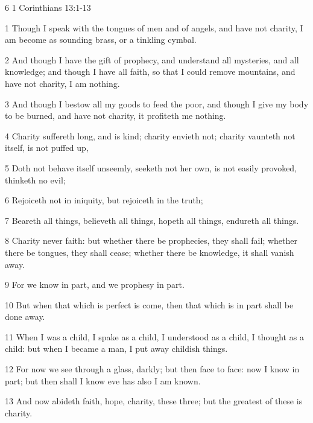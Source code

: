 
6 1 Corinthians 13:1-13

1 Though I speak with the tongues of men and of angels, and have not charity, I
am become as sounding brass, or a tinkling cymbal.

2 And though I have the gift of prophecy, and understand all mysteries, and all
knowledge; and though I have all faith, so that I could remove mountains, and have
not charity, I am nothing.

3 And though I bestow all my goods to feed the poor, and though I give my body
to be burned, and have not charity, it profiteth me nothing.

4 Charity suffereth long, and is kind; charity envieth not; charity vaunteth not
itself, is not puffed up,

5 Doth not behave itself unseemly, seeketh not her own, is not easily provoked,
thinketh no evil;

6 Rejoiceth not in iniquity, but rejoiceth in the truth;

7 Beareth all things, believeth all things, hopeth all things, endureth all things.

8 Charity never faith: but whether there be prophecies, they shall fail; whether
there be tongues, they shall cease; whether there be knowledge, it shall vanish
away.

9 For we know in part, and we prophesy in part.

10 But when that which is perfect is come, then that which is in part shall be
done away.

11 When I was a child, I spake as a child, I understood as a child, I thought as
a child: but when I became a man, I put away childish things.

12 For now we see through a glass, darkly; but then face to face: now I know in
part; but then shall I know eve has also I am known.

13 And now abideth faith, hope, charity, these three; but the greatest of these
is charity.


